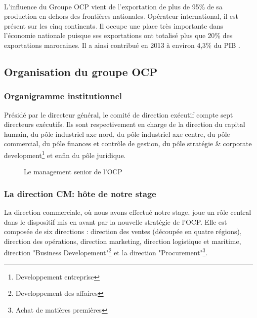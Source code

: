 		\paragraph{}
		L’influence du Groupe OCP vient de l’exportation de plus de 95\% de sa production en dehors
		des frontières nationales. Opérateur international, il est présent sur les cinq continents. Il occupe
		une place très importante dans l'économie nationale puisque ses exportations ont totalisé plus
		que 20\% des exportations marocaines. Il a ainsi contribué en 2013 à environ 4,3\% du PIB \cite{CHEMLAL}.
		\subsection{Organisation du groupe OCP}
		\subsubsection{Organigramme institutionnel}
		Présidé par le directeur général, le comité de direction exécutif compte sept directeurs exécutifs.
		Ils sont respectivement en charge de la direction du capital humain, du pôle industriel axe nord,
		du pôle industriel axe centre, du pôle commercial, du pôle finances et contrôle de gestion, du
		pôle stratégie \& corporate development\footnote{Developpement entreprise} et enfin du pôle juridique.
		\begin{figure}[H]
		    		\centering
		    		\caption{Le management senior de l'OCP \cite{ocp-fil}}
		    		\label{fig:Orga}
			\end{figure}
		\subsubsection{La direction CM: hôte de notre stage}
		La direction commerciale, où nous avons effectué notre stage, joue un rôle central dans le dispositif mis
		en avant par la nouvelle stratégie de l'OCP. Elle est composée de six directions : direction des
		ventes (découpée en quatre régions), direction des opérations, direction marketing, direction
		logistique et maritime, direction "Business Developement"\footnote{Developpement des affaires} et la direction "Procurement"\footnote{Achat de matières
		premières}.
